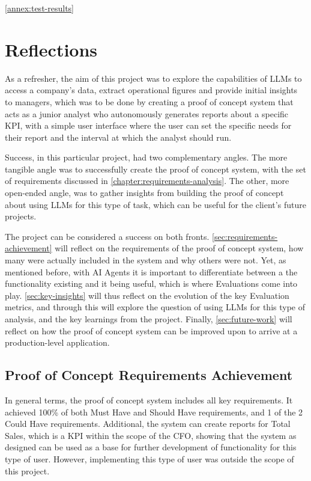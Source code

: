 \documentclass[a4paper]{report}
\begin{document}
\autoref{annex:test-results}

\chapter{Reflections}
\label{chapter:reflections}

As a refresher, the aim of this project was to explore the capabilities of LLMs to access a company's data, extract operational figures and provide initial insights to managers, which was to be done by creating a proof of concept system that acts as a junior analyst who autonomously generates reports about a specific KPI, with a simple user interface where the user can set the specific needs for their report and the interval at which the analyst should run.

Success, in this particular project, had two complementary angles. The more tangible angle was to successfully create the proof of concept system, with the set of requirements discussed in \autoref{chapter:requirements-analysis}. The other, more open-ended angle, was to gather insights from building the proof of concept about using LLMs for this type of task, which can be useful for the client's future projects.

The project can be considered a success on both fronts. \autoref{sec:requirements-achievement} will reflect on the requirements of the proof of concept system, how many were actually included in the system and why others were not. Yet, as mentioned before, with AI Agents it is important to differentiate between a the functionality existing and it being useful, which is where Evaluations come into play. \autoref{sec:key-insights} will thus reflect on the evolution of the key Evaluation metrics, and through this will explore the question of using LLMs for this type of analysis, and the key learnings from the project. Finally, \autoref{sec:future-work} will reflect on how the proof of concept system can be improved upon to arrive at a production-level application.

\section{Proof of Concept Requirements Achievement}
\label{sec:requirements-achievement}

In general terms, the proof of concept system includes all key requirements. It achieved 100\% of both Must Have and Should Have requirements, and 1 of the 2 Could Have requirements. Additional, the system can create reports for Total Sales, which is a KPI within the scope of the CFO, showing that the system as designed can be used as a base for further development of functionality for this type of user. However, implementing this type of user was outside the scope of this project.
\end{document}
